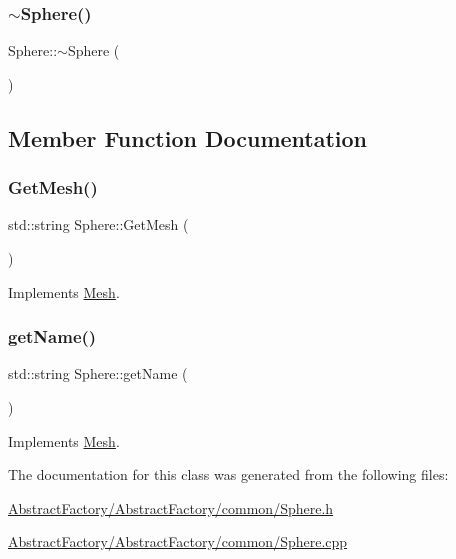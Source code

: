 \subsubsection{\texorpdfstring{$\sim$Sphere()}{~Sphere()}\hspace{0.1cm}{\footnotesize\ttfamily [2/2]}}
{\footnotesize\ttfamily Sphere\+::$\sim$\+Sphere (\begin{DoxyParamCaption}{ }\end{DoxyParamCaption})}



\subsection{Member Function Documentation}
\mbox{\label{class_sphere_afd7c86e5319c93163781df0e44cbfd49}} 
\subsubsection{\texorpdfstring{GetMesh()}{GetMesh()}}
{\footnotesize\ttfamily std\+::string Sphere\+::\+Get\+Mesh (\begin{DoxyParamCaption}{ }\end{DoxyParamCaption})\hspace{0.3cm}{\ttfamily [virtual]}}



Implements \mbox{\hyperlink{class_mesh_ac9a0bc76a4e34c3985cbc4c20692c7df}{Mesh}}.

\mbox{\label{class_sphere_a173e667086ecd8b9d972e1d6f9885d9d}} 
\subsubsection{\texorpdfstring{getName()}{getName()}}
{\footnotesize\ttfamily std\+::string Sphere\+::get\+Name (\begin{DoxyParamCaption}{ }\end{DoxyParamCaption})\hspace{0.3cm}{\ttfamily [virtual]}}



Implements \mbox{\hyperlink{class_mesh_aa131fe1c2586fe60988155db77c57272}{Mesh}}.



The documentation for this class was generated from the following files\+:\begin{DoxyCompactItemize}
\item 
\mbox{\hyperlink{_abstract_factory_2_abstract_factory_2common_2_sphere_8h}{Abstract\+Factory/\+Abstract\+Factory/common/\+Sphere.\+h}}\item 
\mbox{\hyperlink{_abstract_factory_2_abstract_factory_2common_2_sphere_8cpp}{Abstract\+Factory/\+Abstract\+Factory/common/\+Sphere.\+cpp}}\end{DoxyCompactItemize}

